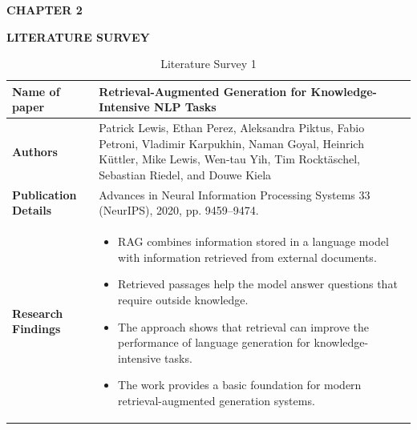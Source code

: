 \documentclass[12pt,a4paper]{report}
\newcommand{\chaptertitle}[2]{
    \begin{flushright}
        {\fontsize{22}{26}\selectfont\bfseries CHAPTER #1\par}
        \vspace{0.10in}
        {\fontsize{22}{26}\selectfont\bfseries #2\par}
    \end{flushright}
    \vspace{0.12in}
}
\begin{document}
\clearpage


\setcounter{table}{0}
\renewcommand{\thetable}{2.\arabic{table}}
\renewcommand{\theHtable}{chapter2.\arabic{table}}
\setcounter{figure}{0}
\renewcommand{\thefigure}{2.\arabic{figure}}
\renewcommand{\theHfigure}{chapter2.\arabic{figure}}

\chaptertitle{2}{LITERATURE SURVEY}
\label{ch:2}
\justifying

\begin{longtable}{|p{1.25in}|p{5.15in}|}
\caption{Literature Survey 1}\label{tab:lit1}\\
\hline
\hline
\textbf{Name of paper} & Retrieval-Augmented Generation for Knowledge-Intensive NLP Tasks \cite{lewis2020rag} \\ \hline

\textbf{Authors} & Patrick Lewis, Ethan Perez, Aleksandra Piktus, Fabio Petroni, Vladimir Karpukhin, Naman Goyal, Heinrich K\"uttler, Mike Lewis, Wen-tau Yih, Tim Rockt\"aschel, Sebastian Riedel, and Douwe Kiela \\ \hline

\textbf{Publication Details} & Advances in Neural Information Processing Systems 33 (NeurIPS), 2020, pp. 9459--9474. \\ \hline

\textbf{Research Findings} &
\begin{itemize}[leftmargin=0.18in,itemsep=0.05in,topsep=0pt,parsep=0pt]
\item RAG combines information stored in a language model with information retrieved from external documents.
\item Retrieved passages help the model answer questions that require outside knowledge.
\item The approach shows that retrieval can improve the performance of language generation for knowledge-intensive tasks.
\item The work provides a basic foundation for modern retrieval-augmented generation systems.
\end{itemize} \\ \hline


\end{longtable}
\end{document}
